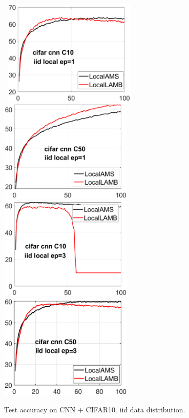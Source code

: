 \documentclass{article}
\begin{document}
\begin{figure}[h]
    \begin{center}
        \mbox{
        \includegraphics[width=2.5in]{figure/cifar_testerror_cnn_ep1_client10_iid1.eps}
        \includegraphics[width=2.5in]{figure/cifar_testerror_cnn_ep1_client50_iid1.eps}
        }
        \mbox{
        \includegraphics[width=2.5in]{figure/cifar_testerror_cnn_ep3_client10_iid1.eps}
        \includegraphics[width=2.5in]{figure/cifar_testerror_cnn_ep3_client50_iid1.eps}
        }
    \end{center}
    \vspace{-0.1in}
	\caption{Test accuracy on CNN + CIFAR10. iid data distribution.}
	\label{fig:cifar-cnn-iid}
\end{figure}
\end{document}
